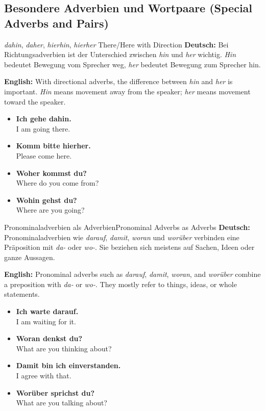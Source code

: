 \documentclass[a4paper,11pt]{article}
\newcommand{\GermanText}[1]{\textbf{Deutsch: }#1\par}
\newcommand{\EnglishText}[1]{{\color{SoftGray}\textbf{English: }#1\par}}
\newcommand{\ExampleItem}[2]{\item \textbf{#1}\\{\color{SoftGray}#2}}
\begin{document}
\subsection{Besondere Adverbien und Wortpaare {\small (Special Adverbs and Pairs)}}

\begin{grammarentry}{
\textit{dahin}, \textit{daher}, \textit{hierhin}, \textit{hierher}
}{There/Here with Direction}
    \GermanText{Bei Richtungsadverbien ist der Unterschied zwischen \textit{hin} und \textit{her} wichtig. \textit{Hin} bedeutet Bewegung vom Sprecher weg, \textit{her} bedeutet Bewegung zum Sprecher hin.}
    \EnglishText{With directional adverbs, the difference between \textit{hin} and \textit{her} is important. \textit{Hin} means movement away from the speaker; \textit{her} means movement toward the speaker.}
    \begin{exbox}
        \begin{itemize}
            \ExampleItem{Ich gehe dahin.}{I am going there.}
            \ExampleItem{Komm bitte hierher.}{Please come here.}
            \ExampleItem{Woher kommst du?}{Where do you come from?}
            \ExampleItem{Wohin gehst du?}{Where are you going?}
        \end{itemize}
    \end{exbox}
\end{grammarentry}

\begin{grammarentry}{Pronominaladverbien als Adverbien}{Pronominal Adverbs as Adverbs}
    \GermanText{Pronominaladverbien wie \textit{darauf}, \textit{damit}, \textit{woran} und \textit{worüber} verbinden eine Präposition mit \textit{da-} oder \textit{wo-}. Sie beziehen sich meistens auf Sachen, Ideen oder ganze Aussagen.}
    \EnglishText{Pronominal adverbs such as \textit{darauf}, \textit{damit}, \textit{woran}, and \textit{worüber} combine a preposition with \textit{da-} or \textit{wo-}. They mostly refer to things, ideas, or whole statements.}
    \begin{exbox}
        \begin{itemize}
            \ExampleItem{Ich warte darauf.}{I am waiting for it.}
            \ExampleItem{Woran denkst du?}{What are you thinking about?}
            \ExampleItem{Damit bin ich einverstanden.}{I agree with that.}
            \ExampleItem{Worüber sprichst du?}{What are you talking about?}
        \end{itemize}
    \end{exbox}
\end{grammarentry}
\end{document}
